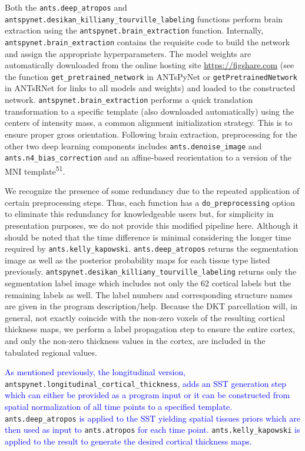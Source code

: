 \documentclass[12pt,]{article}
\begin{document}
Both the \texttt{ants.deep\_atropos} and
\texttt{antspynet.desikan\_killiany\_tourville\_labeling} functions
perform brain extraction using the \texttt{antspynet.brain\_extraction}
function. Internally, \texttt{antspynet.brain\_extraction} contains the
requisite code to build the network and assign the appropriate
hyperparameters. The model weights are automatically downloaded from the
online hosting site \url{https://figshare.com} (see the function
\texttt{get\_pretrained\_network} in ANTsPyNet or
\texttt{getPretrainedNetwork} in ANTsRNet for links to all models and
weights) and loaded to the constructed network.
\texttt{antspynet.brain\_extraction} performs a quick translation
transformation to a specific template (also downloaded automatically)
using the centers of intensity mass, a common alignment initialization
strategy. This is to ensure proper gross orientation. Following brain
extraction, preprocessing for the other two deep learning components
includes \texttt{ants.denoise\_image} and
\texttt{ants.n4\_bias\_correction} and an affine-based reorientation to
a version of the MNI template\textsuperscript{51}.

We recognize the presence of some redundancy due to the repeated
application of certain preprocessing steps. Thus, each function has a
\texttt{do\_preprocessing} option to eliminate this redundancy for
knowledgeable users but, for simplicity in presentation purposes, we do
not provide this modified pipeline here. Although it should be noted
that the time difference is minimal considering the longer time required
by \texttt{ants.kelly\_kapowski}. \texttt{ants.deep\_atropos} returns
the segmentation image as well as the posterior probability maps for
each tissue type listed previously.
\texttt{antspynet.desikan\_killiany\_tourville\_labeling} returns only
the segmentation label image which includes not only the 62 cortical
labels but the remaining labels as well. The label numbers and
corresponding structure names are given in the program description/help.
Because the DKT parcellation will, in general, not exactly coincide with
the non-zero voxels of the resulting cortical thickness maps, we perform
a label propagation step to ensure the entire cortex, and only the
non-zero thickness values in the cortex, are included in the tabulated
regional values.

\textcolor{blue}{As mentioned previously, the longitudinal version,}
\texttt{antspynet.longitudinal\_cortical\_thickness},
\textcolor{blue}{adds an SST
generation step which can either be provided as a program input or it can be
constructed from spatial normalization of all time points to a specified
template.} \texttt{ants.deep\_atropos}
\textcolor{blue}{is applied to the SST
yielding spatial tissues priors which are then used as input to}
\texttt{ants.atropos} \textcolor{blue}{for each time point. }
\texttt{ants.kelly\_kapowski}
\textcolor{blue}{is applied to the result to generate the desired cortical
thickness maps.}
\end{document}
